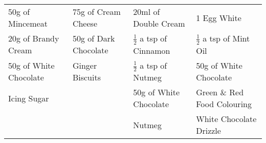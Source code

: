 \documentclass[11pt, english]{article}
\begin{document}
\begin{center}
\begin{longtable}{p{3.75cm}p{3.75cm}p{3.75cm}p{3.75cm}}
        	50g of Mincemeat & 75g of Cream Cheese & 20ml of Double Cream & 1 Egg White\\
	        20g of Brandy Cream & 50g of Dark Chocolate & $\frac{1}{2}$ a tsp of Cinnamon & $\frac{1}{2}$ a tsp of Mint Oil\\
	        50g of White Chocolate & Ginger Biscuits & $\frac{1}{2}$ a tsp of Nutmeg & 50g of White Chocolate\\
	        Icing Sugar & & 50g of White Chocolate & Green \& Red Food Colouring\\
	        & & Nutmeg & White Chocolate Drizzle\\
	        \hline
	\end{longtable}
	\end{center}
\end{document}
